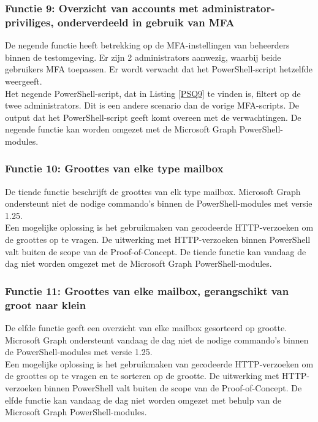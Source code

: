 \subsubsection{Functie 9: Overzicht van accounts met administrator-priviliges, onderverdeeld in gebruik van MFA}

De negende functie heeft betrekking op de \ac{MFA}-instellingen van beheerders binnen de testomgeving. Er zijn 2 administrators aanwezig, waarbij beide gebruikers \ac{MFA} toepassen. Er wordt verwacht dat het PowerShell-script hetzelfde weergeeft. \\

Het negende PowerShell-script, dat in Listing \ref{PSQ9} te vinden is, filtert op de twee administrators. Dit is een andere scenario dan de vorige \ac{MFA}-scripts. De output dat het PowerShell-script geeft komt overeen met de verwachtingen. De negende functie kan worden omgezet met de Microsoft Graph PowerShell-modules.

\subsubsection{Functie 10: Groottes van elke type mailbox}

De tiende functie beschrijft de groottes van elk type mailbox. Microsoft Graph ondersteunt niet de nodige commando's binnen de PowerShell-modules met versie 1.25. \\

Een mogelijke oplossing is het gebruikmaken van gecodeerde \ac{HTTP}-verzoeken om de groottes op te vragen. De uitwerking met \ac{HTTP}-verzoeken binnen PowerShell valt buiten de scope van de Proof-of-Concept. De tiende functie kan vandaag de dag niet worden omgezet met de Microsoft Graph PowerShell-modules.

\subsubsection{Functie 11: Groottes van elke mailbox, gerangschikt van groot naar klein}

De elfde functie geeft een overzicht van elke mailbox gesorteerd op grootte. Microsoft Graph ondersteunt vandaag de dag niet de nodige commando's binnen de PowerShell-modules met versie 1.25. \\ 

Een mogelijke oplossing is het gebruikmaken van gecodeerde \ac{HTTP}-verzoeken om de groottes op te vragen en te sorteren op de grootte. De uitwerking met \ac{HTTP}-verzoeken binnen PowerShell valt buiten de scope van de Proof-of-Concept. De elfde functie kan vandaag de dag niet worden omgezet met behulp van de Microsoft Graph PowerShell-modules.

